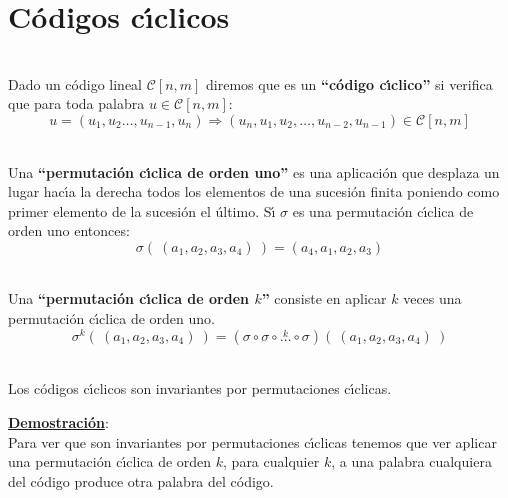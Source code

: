 %
%

\chapter{C\'odigos c\'{\i}clicos}

\begin{definicion}
\ \\
Dado un c\'odigo lineal $\mathcal{C}[n,m]$ diremos que es un \textbf{``c\'odigo 
c\'{\i}clico''} si verifica que para toda palabra $u\in\mathcal{C}[n,m]$:
\begin{displaymath}
u=(u_1,u_2\dots,u_{n-1},u_n)\Longrightarrow (u_n,u_1,u_2,\dots,u_{n-2},u_{n-1})
\in \mathcal{C}[n,m]
\end{displaymath}
\end{definicion}

\begin{definicion}
\ \\
Una \textbf{``permutaci\'on c\'{\i}clica de orden uno''} es una aplicaci\'on
que desplaza un lugar hac\'{\i}a la derecha todos los elementos de una
sucesi\'on finita poniendo como primer elemento de la sucesi\'on el \'ultimo.
S\'{\i} $\sigma$ es una permutaci\'on c\'{\i}clica de orden uno entonces:
\begin{displaymath}
\sigma(\ (a_1,a_2,a_3,a_4)\ ) =(a_4,a_1,a_2,a_3)
\end{displaymath}
\end{definicion}

\begin{definicion}
\ \\
Una \textbf{``permutaci\'on c\'{\i}clica de orden $k$''} consiste en aplicar
$k$ veces una permutaci\'on c\'{\i}clica de orden uno.
\begin{displaymath}
\sigma^{k}(\ (a_1,a_2,a_3,a_4)\ ) = (\sigma \circ \sigma \circ \stackrel{k}\dots
\circ \sigma)(\ (a_1,a_2,a_3,a_4)\ )
\end{displaymath}
\end{definicion}
%
\newpage
%
\begin{proposicion}
\ \\
Los c\'odigos c\'{\i}clicos son invariantes por permutaciones c\'{\i}clicas.
\end{proposicion}
\underline{\textbf{Demostraci\'on}}:\\
Para ver que son invariantes por permutaciones c\'{\i}clicas tenemos que ver
aplicar una permutaci\'on c\'{\i}clica de orden $k$, para cualquier $k$, a
una palabra cualquiera del c\'odigo produce otra palabra del c\'odigo.\\

